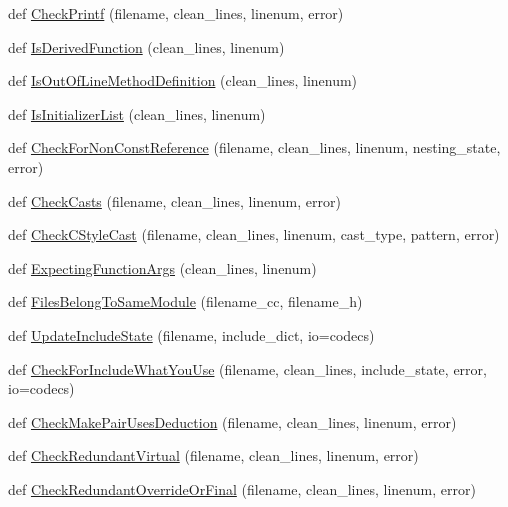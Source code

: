 \begin{DoxyCompactItemize}
\item 
def \hyperlink{namespacecpplint_aaa8b988b9e83ad1c8964ecc0739d52e5}{Check\+Printf} (filename, clean\+\_\+lines, linenum, error)
\item 
def \hyperlink{namespacecpplint_ac8519cf084d818c931eac29994b03f55}{Is\+Derived\+Function} (clean\+\_\+lines, linenum)
\item 
def \hyperlink{namespacecpplint_a52e4468f674e140c256254eb0d1cf007}{Is\+Out\+Of\+Line\+Method\+Definition} (clean\+\_\+lines, linenum)
\item 
def \hyperlink{namespacecpplint_ae06fb1dd669681214573c0441b7e854f}{Is\+Initializer\+List} (clean\+\_\+lines, linenum)
\item 
def \hyperlink{namespacecpplint_a97f01c7d6e7e6d38b52744ab393d4160}{Check\+For\+Non\+Const\+Reference} (filename, clean\+\_\+lines, linenum, nesting\+\_\+state, error)
\item 
def \hyperlink{namespacecpplint_a59c5f44ae1dbedad109809d46e80588e}{Check\+Casts} (filename, clean\+\_\+lines, linenum, error)
\item 
def \hyperlink{namespacecpplint_ac23d9b29d869054db2ece1e7d5196349}{Check\+C\+Style\+Cast} (filename, clean\+\_\+lines, linenum, cast\+\_\+type, pattern, error)
\item 
def \hyperlink{namespacecpplint_a7657def0315cfe229ba436632f2d5042}{Expecting\+Function\+Args} (clean\+\_\+lines, linenum)
\item 
def \hyperlink{namespacecpplint_a66083e7d453e845a2751e76043fcd9ea}{Files\+Belong\+To\+Same\+Module} (filename\+\_\+cc, filename\+\_\+h)
\item 
def \hyperlink{namespacecpplint_a127416bee5c376937479b3119a727817}{Update\+Include\+State} (filename, include\+\_\+dict, io=codecs)
\item 
def \hyperlink{namespacecpplint_a8e1a5bea9f77246f8a0ae98a23d8d04e}{Check\+For\+Include\+What\+You\+Use} (filename, clean\+\_\+lines, include\+\_\+state, error, io=codecs)
\item 
def \hyperlink{namespacecpplint_add392d0ab0e8bcfeea6d02410229a0cc}{Check\+Make\+Pair\+Uses\+Deduction} (filename, clean\+\_\+lines, linenum, error)
\item 
def \hyperlink{namespacecpplint_a828985bee0575cfbb64212db74b61d9a}{Check\+Redundant\+Virtual} (filename, clean\+\_\+lines, linenum, error)
\item 
def \hyperlink{namespacecpplint_ab4f9b0390c702f149cec4030901d249d}{Check\+Redundant\+Override\+Or\+Final} (filename, clean\+\_\+lines, linenum, error)

\end{DoxyCompactItemize}
